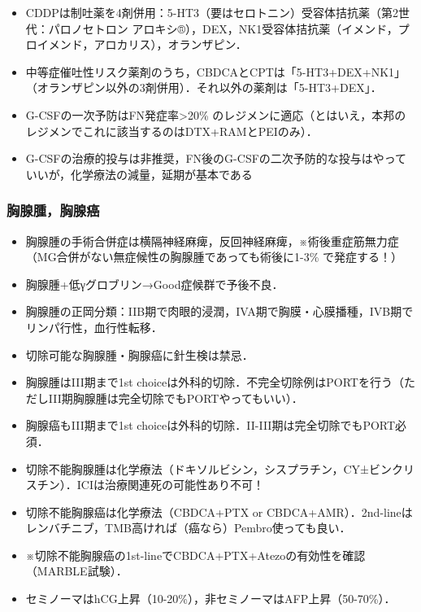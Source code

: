 \begin{itemize}
\item CDDPは制吐薬を4剤併用：5-HT3（要はセロトニン）受容体拮抗薬（第2世代：パロノセトロン アロキシ®），DEX，NK1受容体拮抗薬（イメンド，プロイメンド，アロカリス），オランザピン．
\item 中等症催吐性リスク薬剤のうち，CBDCAとCPTは「5-HT3+DEX+NK1」（オランザピン以外の3剤併用）．それ以外の薬剤は「5-HT3+DEX」．
\item G-CSFの一次予防はFN発症率>20\% のレジメンに適応（とはいえ，本邦のレジメンでこれに該当するのはDTX+RAMとPEIのみ）．
\item G-CSFの治療的投与は非推奨，FN後のG-CSFの二次予防的な投与はやっていいが，化学療法の減量，延期が基本である
\end{itemize}

\subsubsection{胸腺腫，胸腺癌}

\begin{itemize}
\item 胸腺腫の手術合併症は横隔神経麻痺，反回神経麻痺，※術後重症筋無力症（MG合併がない無症候性の胸腺腫であっても術後に1-3\% で発症する！）
\item 胸腺腫+低γグロブリン→Good症候群で予後不良．
\item 胸腺腫の正岡分類：IIB期で肉眼的浸潤，IVA期で胸膜・心膜播種，IVB期でリンパ行性，血行性転移．


\item 切除可能な胸腺腫・胸腺癌に針生検は禁忌．
\item 胸腺腫はIII期まで1st choiceは外科的切除．不完全切除例はPORTを行う（ただしIII期胸腺腫は完全切除でもPORTやってもいい）．
\item 胸腺癌もIII期まで1st choiceは外科的切除．II-III期は完全切除でもPORT必須．
\item 切除不能胸腺腫は化学療法（ドキソルビシン，シスプラチン，CY±ビンクリスチン）．ICIは治療関連死の可能性あり不可！
\item 切除不能胸腺癌は化学療法（CBDCA+PTX or CBDCA+AMR）．2nd-lineはレンバチニブ，TMB高ければ（癌なら）Pembro使っても良い．
\item ※切除不能胸腺癌の1st-lineでCBDCA+PTX+Atezoの有効性を確認（MARBLE試験）．
\item セミノーマはhCG上昇（10-20\%），非セミノーマはAFP上昇（50-70\%）．
\end{itemize}


